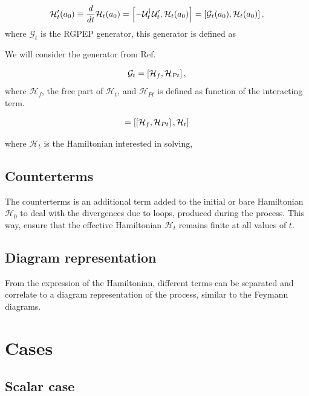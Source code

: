 \documentclass[11pt,a4paper,twoside,pdf]{article}
\numberwithin{equation}{section}
\begin{document}
\begin{equation}
    \mathcal{H}_t^\prime (a_0) \equiv \frac{d}{dt}\mathcal{H}_t(a_0) = 
    \left[ -\mathcal{U}_t^\dagger \mathcal{U}_t^\prime, \mathcal{H}_t(a_0) \right] 
    = \left[ \mathcal{G}_t(a_0), \mathcal{H}_t(a_0) \right],
\end{equation}
where $\mathcal{G}_t$ is the RGPEP generator, this generator is defined as 

We will consider the generator from Ref. \cite{PEP}

\begin{equation}
    \mathcal{G}_t = \left[ \mathcal{H}_f, \mathcal{H}_{Pt} \right],
\end{equation}
where $\mathcal{H}_f$, the free part of $\mathcal{H}_t$, and $\mathcal{H}_{Pt}$ is 
defined as function of the interacting term.

\begin{equation}
    =  \left[ \left[ \mathcal{H}_f, \mathcal{H}_{Pt} \right], \mathcal{H}_t \right]
\end{equation}

where $\mathcal{H}_t$ is the Hamiltonian interested in solving, 

\subsection{Counterterms}

The counterterms is an additional term added to the initial or bare Hamiltonian 
$\mathcal{H}_0$ to deal with the divergences due to loops, produced during the 
process. This way, ensure that the effective Hamiltonian $\mathcal{H}_t$ remains 
finite at all values of $t$.

\subsection{Diagram representation}

From the expression of the Hamiltonian, different terms can be separated and correlate
to a diagram representation of the process, similar to the Feymann diagrams.


\section{Cases}

\subsection{Scalar case}
\end{document}
